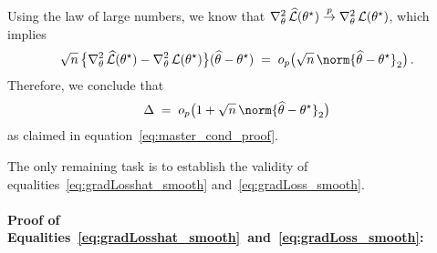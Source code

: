 	Using the law of large numbers, we know that $\nabla_{\theta}^2 \,  \widehat{\mathcal{L}} (\theta^{\star}) \stackrel{p}{\rightarrow} \nabla_{\theta}^2 \,  \mathcal{L} (\theta^{\star})$, which implies
	\begin{align*}
		\sqrt{n} \, \big\{ \hesstheta \Losshat (\parathetastar) - \hesstheta \Loss (\parathetastar) \big\} (\parathetahat - \parathetastar) \; = \; \smallop \big( \sqrt{n} \, \norm{ \parathetahat - \parathetastar }_2 \big) \, .
	\end{align*}
	Therefore, we conclude that
	\begin{align*}
		\Delta \; = \; \smallop \big( 1 + \sqrt{n} \, \norm{ \parathetahat - \parathetastar }_2 \big)
	\end{align*}
	as claimed in equation~\eqref{eq:master_cond_proof}.
	
	The only remaining task is to establish the validity of equalities~\eqref{eq:gradLosshat_smooth} and~\eqref{eq:gradLoss_smooth}.
	
	
	\paragraph{Proof of Equalities~\eqref{eq:gradLosshat_smooth}~and~\eqref{eq:gradLoss_smooth}:}
	
